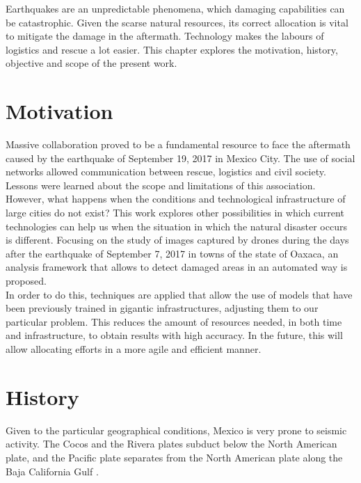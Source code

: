 Earthquakes are an unpredictable phenomena, which damaging capabilities can be catastrophic. Given the scarse natural resources, its correct allocation is vital to mitigate the damage in the aftermath. Technology makes the labours of logistics and rescue a lot easier. This chapter explores the motivation, history, objective and scope of the present work.\\


\section{Motivation}


Massive collaboration proved to be a fundamental resource to face the aftermath caused by the earthquake of September 19, 2017 in Mexico City. The use of social networks allowed communication between rescue, logistics and civil society. Lessons were learned about the scope and limitations of this association.\\

However, what happens when the conditions and technological infrastructure of large cities do not exist? This work explores other possibilities in which current technologies can help us when the situation in which the natural disaster occurs is different. Focusing on the study of images captured by drones during the days after the earthquake of September 7, 2017 in towns of the state of Oaxaca, an analysis framework that allows to detect damaged areas in an automated way is proposed.\\

In order to do this, techniques are applied that allow the use of models that have been previously trained in gigantic infrastructures, adjusting them to our particular problem. This reduces the amount of resources needed, in both time and infrastructure, to obtain results with high accuracy. In the future, this will allow allocating efforts in a more agile and efficient manner.\\

\section{History}

Given to the particular geographical conditions, Mexico is very prone to seismic activity. The Cocos and the Rivera plates subduct below the North American plate, and the Pacific plate separates from the North American plate along the Baja California Gulf \cite{AG3315}.\\

